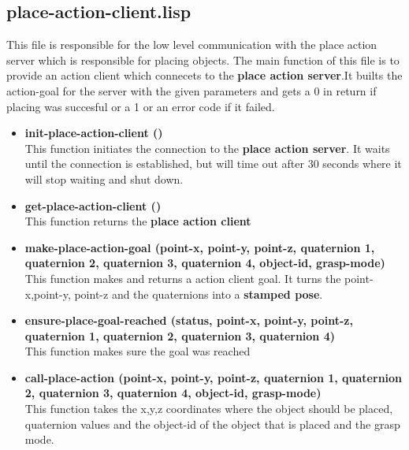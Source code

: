 \documentclass[main.tex]{subfiles}
\begin{document}
		\subsection{place-action-client.lisp}
		This file is responsible for the low level communication with the
		place action server which is responsible for placing objects. The main function of this file is to provide an action client which connecets to the \textbf{place action server}.It builts the action-goal for the server with the given parameters and gets a 0 in return if placing was succesful or a 1  or an error code if it failed. 
	    \begin{itemize}
			\item \textbf{init-place-action-client ()} \\
			This function initiates the connection to the \textbf{place action server}. It waits until the connection is established, but will time out after 30 seconds where it will stop waiting and shut down. 
			\item \textbf{get-place-action-client ()} \\
			This function returns the \textbf{place action client}
			\item \textbf{make-place-action-goal (point-x, point-y, point-z, quaternion 1, quaternion 2, quaternion 3, quaternion 4, object-id, grasp-mode)} \\
			This function makes and returns a action client goal. It turns the point-x,point-y, point-z and the quaternions into a \textbf{stamped pose}.				
			\item \textbf{ensure-place-goal-reached (status, point-x, point-y, point-z, quaternion 1, quaternion 2, quaternion 3, quaternion 4)} \\
            This function makes sure the goal was reached
			\item \textbf{call-place-action (point-x, point-y, point-z, quaternion 1, quaternion 2, quaternion 3, quaternion 4, object-id, grasp-mode)} \\
			This function takes the x,y,z coordinates where the object should be placed, quaternion values  and the object-id of the object that is placed and the grasp mode.
		\end{itemize}
\end{document}

